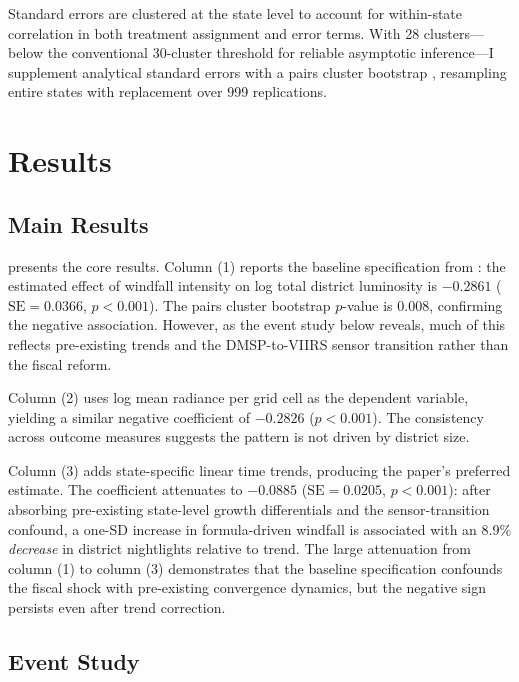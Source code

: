 \documentclass[12pt]{article}
\begin{document}
Standard errors are clustered at the state level to account for within-state correlation in both treatment assignment and error terms. With 28 clusters---below the conventional 30-cluster threshold for reliable asymptotic inference---I supplement analytical standard errors with a pairs cluster bootstrap \citep{cameron2008bootstrap}, resampling entire states with replacement over 999 replications.


\section{Results}

\subsection{Main Results}

 presents the core results. Column (1) reports the baseline specification from : the estimated effect of windfall intensity on log total district luminosity is $-0.2861$ ($\text{SE} = 0.0366$, $p < 0.001$). The pairs cluster bootstrap $p$-value is 0.008, confirming the negative association. However, as the event study below reveals, much of this reflects pre-existing trends and the DMSP-to-VIIRS sensor transition rather than the fiscal reform.

Column (2) uses log mean radiance per grid cell as the dependent variable, yielding a similar negative coefficient of $-0.2826$ ($p < 0.001$). The consistency across outcome measures suggests the pattern is not driven by district size.

Column (3) adds state-specific linear time trends, producing the paper's preferred estimate. The coefficient attenuates to $-0.0885$ ($\text{SE} = 0.0205$, $p < 0.001$): after absorbing pre-existing state-level growth differentials and the sensor-transition confound, a one-SD increase in formula-driven windfall is associated with an 8.9\% \emph{decrease} in district nightlights relative to trend. The large attenuation from column (1) to column (3) demonstrates that the baseline specification confounds the fiscal shock with pre-existing convergence dynamics, but the negative sign persists even after trend correction.



\subsection{Event Study}
\end{document}
